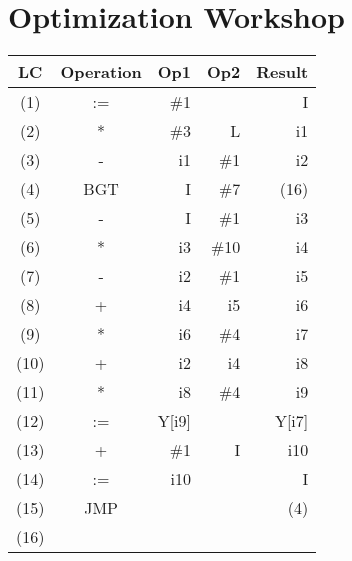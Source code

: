 \documentclass[a4paper,11pt]{article}
\begin{document}

\section*{Optimization Workshop}

\begin{tabular}{ | c | c | r | r | r |}
  \hline
    LC & Operation & Op1 & Op2 & Result  \\ \hline
    (1) & := & \#1 & & I \\ \hline
    (2) & * & \#3 & L & i1 \\ \hline
    (3) & - & i1 & \#1 & i2 \\ \hline
    (4) & BGT & I & \#7 & (16) \\ \hline
    (5) & - & I & \#1 & i3 \\ \hline
    (6) & * & i3 & \#10 & i4 \\ \hline
    (7) & - & i2 & \#1 & i5 \\ \hline
    (8) & + & i4 & i5 & i6 \\ \hline
    (9) & * & i6 & \#4 & i7 \\ \hline
  (10) & + & i2 & i4 & i8 \\ \hline
   (11) & * & i8 & \#4 & i9 \\ \hline
   (12) & := & Y[i9] &   & Y[i7] \\ \hline
   (13) & + & \#1 & I & i10 \\ \hline
   (14) & := & i10 &  & I \\ \hline
   (15) & JMP &  &  & (4) \\ \hline
   (16) &   &   &   &  \\ \hline

\end{tabular}

\end{document}
